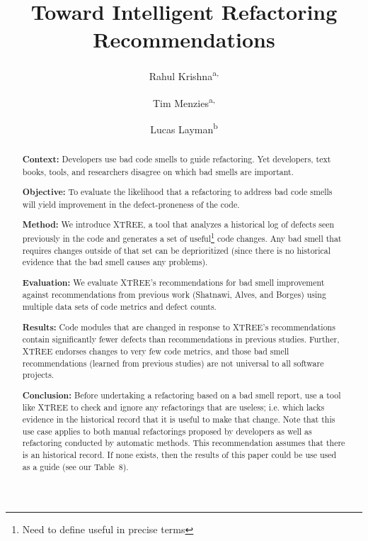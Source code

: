\documentclass[twocolumn,5p]{elsarticle}
\theoremstyle{break}
\begin{document}
\begin{frontmatter}

\title{Toward Intelligent Refactoring Recommendations}

\author{Rahul Krishna\textsuperscript{a,}}
\author{Tim Menzies\textsuperscript{a,}}
\author{Lucas Layman\textsuperscript{b}}
\address{\textsuperscript{a}Department of Computer Science, North Carolina State University, Raleigh, NC, USA\\
\textsuperscript{b}Fraunhofer CESE, College Park, USA}

\begin{abstract} 
{\bf Context: } 
Developers use bad code smells to guide refactoring.
Yet developers, text books, tools, and researchers disagree on which bad smells are important.

\noindent 
{\bf Objective:} To evaluate the likelihood that a refactoring to address bad code smells will yield improvement in the defect-proneness of the code.

\noindent
{\bf Method: } We introduce XTREE, a tool that analyzes a historical log of defects seen previously in the code and generates a set of useful\footnote{Need to define useful in precise terms} code changes.
Any bad smell that requires changes outside of that set can be deprioritized (since there is no historical evidence that the bad smell causes any problems).

\noindent
{\bf Evaluation: } We evaluate XTREE's recommendations for bad smell improvement against recommendations from previous work (Shatnawi, Alves, and Borges) using multiple data sets of code metrics and defect counts.  

\noindent
{\bf Results: }Code modules that are changed in response to XTREE's recommendations contain significantly fewer defects than recommendations in previous studies. Further, XTREE endorses changes to very few code metrics, and those bad smell recommendations (learned from previous studies) are not universal to all  software projects.

\noindent
{\bf Conclusion: }
Before undertaking a refactoring based on a bad smell report,
use a tool like XTREE to check and ignore any refactorings   that  are useless; i.e. which lacks evidence
  in the historical record  that it is useful to make that change.
  Note that this use case applies to both manual refactorings proposed by developers
as well as refactoring  conducted by automatic methods.
This recommendation assumes that there is an historical record.
If none exists, then the results of this paper could be use used as a guide (see our
Table~8). 


\end{abstract}
\end{frontmatter}
\end{document}
